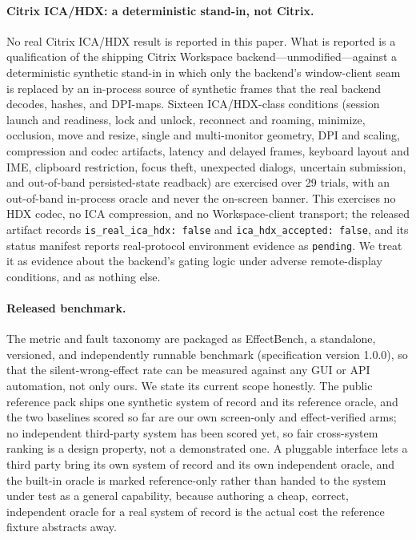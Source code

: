 \paragraph{Citrix ICA/HDX: a deterministic stand-in, not Citrix.}
No real Citrix ICA/HDX result is reported in this paper. What is reported is a
qualification of the shipping Citrix Workspace backend---unmodified---against a
deterministic synthetic stand-in in which only the backend's window-client seam
is replaced by an in-process source of synthetic frames that the real backend
decodes, hashes, and DPI-maps. Sixteen ICA/HDX-class conditions (session launch
and readiness, lock and unlock, reconnect and roaming, minimize, occlusion, move
and resize, single and multi-monitor geometry, DPI and scaling, compression and
codec artifacts, latency and delayed frames, keyboard layout and IME, clipboard
restriction, focus theft, unexpected dialogs, uncertain submission, and
out-of-band persisted-state readback) are exercised over 29 trials, with an
out-of-band in-process oracle and never the on-screen banner. This exercises no
HDX codec, no ICA compression, and no Workspace-client transport; the released
artifact records \texttt{is\_real\_ica\_hdx: false} and
\texttt{ica\_hdx\_accepted: false}, and its status manifest reports
real-protocol environment evidence as \texttt{pending}. We treat it as evidence
about the backend's gating logic under adverse remote-display conditions, and as
nothing else.

\paragraph{Released benchmark.}
The metric and fault taxonomy are packaged as EffectBench, a standalone,
versioned, and independently runnable benchmark (specification version 1.0.0), so
that the silent-wrong-effect rate can be measured against any GUI or API
automation, not only ours. We state its current scope honestly. The public
reference pack ships one synthetic system of record and its reference oracle, and
the two baselines scored so far are our own screen-only and effect-verified arms;
no independent third-party system has been scored yet, so fair cross-system
ranking is a design property, not a demonstrated one. A pluggable interface lets
a third party bring its own system of record and its own independent oracle, and
the built-in oracle is marked reference-only rather than handed to the system
under test as a general capability, because authoring a cheap, correct,
independent oracle for a real system of record is the actual cost the reference
fixture abstracts away.

